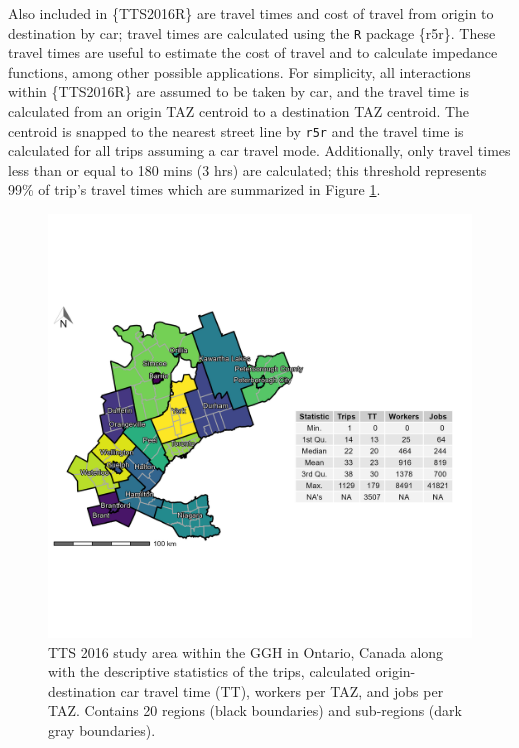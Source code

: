 \documentclass[Royal,times,sageh]{sagej}
\begin{document}
Also included in \{TTS2016R\} are travel times and cost of travel from
origin to destination by car; travel times are calculated using the
\texttt{R} package \{r5r\}. These travel times are useful to estimate
the cost of travel and to calculate impedance functions, among other
possible applications. For simplicity, all interactions within
\{TTS2016R\} are assumed to be taken by car, and the travel time is
calculated from an origin TAZ centroid to a destination TAZ centroid.
The centroid is snapped to the nearest street line by \texttt{r5r} and
the travel time is calculated for all trips assuming a car travel mode.
Additionally, only travel times less than or equal to 180 mins (3 hrs)
are calculated; this threshold represents 99\% of trip's travel times
which are summarized in Figure \ref{fig:TTS-16-survey-area}.

\begin{figure}

{\centering \includegraphics[width=1\linewidth]{images/TTS16-survey-area} 

}

\caption{\label{fig:TTS-16-survey-area}TTS 2016 study area within the GGH in Ontario, Canada along with the descriptive statistics of the trips, calculated origin-destination car travel time (TT), workers per TAZ, and jobs per TAZ. Contains 20 regions (black boundaries) and sub-regions (dark gray boundaries).}\label{fig:TTS-16-survey-area}
\end{figure}
\end{document}
